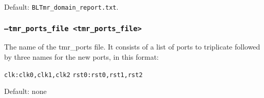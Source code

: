 Default: \texttt{BLTmr\_domain\_report.txt}.

\subsubsection{\texttt{--tmr\_ports\_file <tmr\_ports\_file>}}
The name of the tmr\_ports file. It consists of a list of ports to
triplicate followed by three names for the new ports, in this format:

\texttt{clk:clk0,clk1,clk2}
\texttt{rst0:rst0,rst1,rst2}

Default: none




